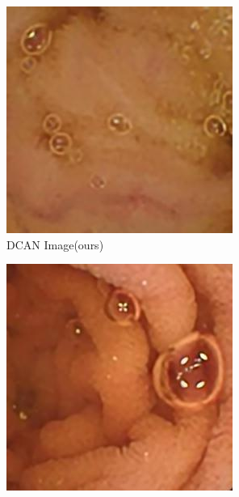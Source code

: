 \begin{figure}[H]
     \begin{subfigure}[b]{0.275\textwidth}
    \includegraphics[width=\textwidth]{Chapter7/DCAN_9.jpg}
    \caption{DCAN Image(ours)}
  \end{subfigure}
  \begin{subfigure}[b]{0.275\textwidth}
    \includegraphics[width=\textwidth]{Chapter7/Dense_445.jpg}

\end{subfigure}
\end{figure}
